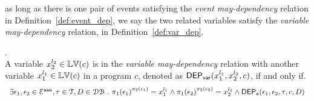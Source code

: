 as long as there is one pair of events satisfying the \emph{event may-dependency} relation in Definition~\ref{def:event_dep}, 
 we say the two 
related
variables satisfy the \emph{variable may-dependency} relation, in Definition~\ref{def:var_dep}.
\begin{defn}.
  \label{def:var_dep}
  \\
  A variable ${x}_2^{l_2} \in \mathbb{LV}(c)$ is in the \emph{variable may-dependency} relation with another
  variable ${x}_1^{l_1} \in \mathbb{LV}(c)$ in a program ${c}$, denoted as 
  $\mathsf{DEP_{var}}({x}_1^{l_1}, {x}_2^{l_2}, {c})$, if and only if.
\[
  \begin{array}{l}
\exists \event_1, \event_2 \in \eventset^{\asn}, \trace \in \mathcal{T} , D \in \dbdom \st
\pi_{1}{(\event_1)}^{\pi_{2}{(\event_1)}} = {x}_1^{l_1}
\land
\pi_{1}{(\event_2)}^{\pi_{2}{(\event_2)}} = {x}_2^{l_2}%
\land 
\eventdep(\event_1, \event_2, \trace, c, D) 
  \end{array}
\]  %
  \end{defn}
